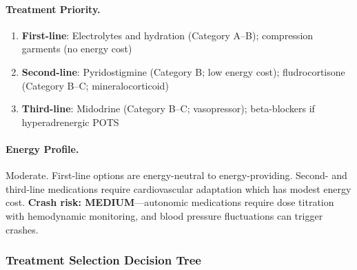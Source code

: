 \paragraph{Treatment Priority.}
\begin{enumerate}
    \item \textbf{First-line}: Electrolytes and hydration (Category A--B); compression garments (no energy cost)
    \item \textbf{Second-line}: Pyridostigmine (Category B; low energy cost); fludrocortisone (Category B--C; mineralocorticoid)
    \item \textbf{Third-line}: Midodrine (Category B--C; vasopressor); beta-blockers if hyperadrenergic POTS
\end{enumerate}

\paragraph{Energy Profile.} Moderate. First-line options are energy-neutral to energy-providing. Second- and third-line medications require cardiovascular adaptation which has modest energy cost. \textbf{Crash risk: MEDIUM}---autonomic medications require dose titration with hemodynamic monitoring, and blood pressure fluctuations can trigger crashes.

\subsubsection{Treatment Selection Decision Tree}

